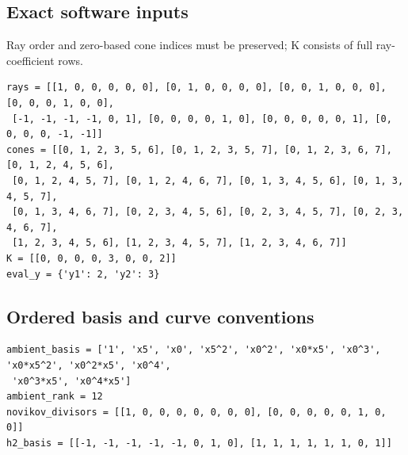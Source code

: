 \documentclass[10pt,a4paper]{article}
\begin{document}
\subsection*{Exact software inputs}
Ray order and zero-based cone indices must be preserved; K consists of full ray-coefficient rows.
\begin{lstlisting}
rays = [[1, 0, 0, 0, 0, 0], [0, 1, 0, 0, 0, 0], [0, 0, 1, 0, 0, 0], [0, 0, 0, 1, 0, 0],
 [-1, -1, -1, -1, 0, 1], [0, 0, 0, 0, 1, 0], [0, 0, 0, 0, 0, 1], [0, 0, 0, 0, -1, -1]]
cones = [[0, 1, 2, 3, 5, 6], [0, 1, 2, 3, 5, 7], [0, 1, 2, 3, 6, 7], [0, 1, 2, 4, 5, 6],
 [0, 1, 2, 4, 5, 7], [0, 1, 2, 4, 6, 7], [0, 1, 3, 4, 5, 6], [0, 1, 3, 4, 5, 7],
 [0, 1, 3, 4, 6, 7], [0, 2, 3, 4, 5, 6], [0, 2, 3, 4, 5, 7], [0, 2, 3, 4, 6, 7],
 [1, 2, 3, 4, 5, 6], [1, 2, 3, 4, 5, 7], [1, 2, 3, 4, 6, 7]]
K = [[0, 0, 0, 0, 3, 0, 0, 2]]
eval_y = {'y1': 2, 'y2': 3}
\end{lstlisting}
\subsection*{Ordered basis and curve conventions}
\begin{lstlisting}
ambient_basis = ['1', 'x5', 'x0', 'x5^2', 'x0^2', 'x0*x5', 'x0^3', 'x0*x5^2', 'x0^2*x5', 'x0^4',
 'x0^3*x5', 'x0^4*x5']
ambient_rank = 12
novikov_divisors = [[1, 0, 0, 0, 0, 0, 0, 0], [0, 0, 0, 0, 0, 1, 0, 0]]
h2_basis = [[-1, -1, -1, -1, -1, 0, 1, 0], [1, 1, 1, 1, 1, 1, 0, 1]]
\end{lstlisting}
\end{document}
